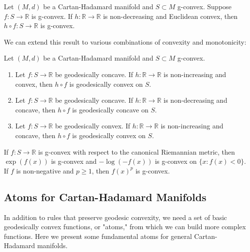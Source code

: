 \begin{proposition}
Let $(M, d)$ be a Cartan-Hadamard manifold and $S \subset M$ g-convex. Suppose $f: S \rightarrow \mathbb{R}$ is g-convex. If $h: \mathbb{R} \rightarrow \mathbb{R}$ is non-decreasing and Euclidean convex, then $h \circ f: S \rightarrow \mathbb{R}$ is g-convex.
\end{proposition}

We can extend this result to various combinations of convexity and monotonicity:

\begin{corollary}
Let $(M, d)$ be a Cartan-Hadamard manifold and $S \subset M$ g-convex.
\begin{enumerate}
\item Let $f: S \rightarrow \mathbb{R}$ be geodesically concave. If $h: \mathbb{R} \rightarrow \mathbb{R}$ is non-increasing and convex, then $h \circ f$ is geodesically convex on $S$.
\item Let $f: S \rightarrow \mathbb{R}$ be geodesically concave. If $h: \mathbb{R} \rightarrow \mathbb{R}$ is non-decreasing and concave, then $h \circ f$ is geodesically concave on $S$.
\item Let $f: S \rightarrow \mathbb{R}$ be geodesically convex. If $h: \mathbb{R} \rightarrow \mathbb{R}$ is non-increasing and concave, then $h \circ f$ is geodesically convex on $S$.
\end{enumerate}
\end{corollary}

\begin{example}
If $f: S \rightarrow \mathbb{R}$ is g-convex with respect to the canonical Riemannian metric, then $\exp(f(x))$ is g-convex and $-\log(-f(x))$ is g-convex on $\{x: f(x) < 0\}$. If $f$ is non-negative and $p \geq 1$, then $f(x)^p$ is g-convex.
\end{example}

\subsection{Atoms for Cartan-Hadamard Manifolds}

In addition to rules that preserve geodesic convexity, we need a set of basic geodesically convex functions, or "atoms," from which we can build more complex functions. Here we present some fundamental atoms for general Cartan-Hadamard manifolds.

